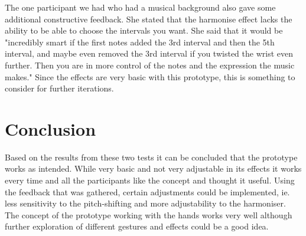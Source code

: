 The one participant we had who had a musical background also gave some additional constructive feedback. She stated that the harmonise effect lacks the ability to be able to choose the intervals you want. She said that it would be "incredibly smart if the first notes added the 3rd interval and then the 5th interval, and maybe even removed the 3rd interval if you twisted the wrist even further. Then you are in more control of the notes and the expression the music makes." Since the effects are very basic with this prototype, this is something to consider for further iterations. 

\section{Conclusion}
Based on the results from these two tests it can be concluded that the prototype works as intended. While very basic and not very adjustable in its effects it works every time and all the participants like the concept and thought it useful. Using the feedback that was gathered, certain adjustments could be implemented, ie. less sensitivity to the pitch-shifting and more adjustability to the harmoniser. The concept of the prototype working with the hands works very well although further exploration of different gestures and effects could be a good idea. 


